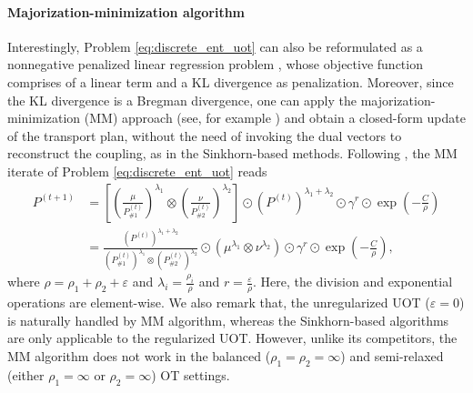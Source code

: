 \paragraph{Majorization-minimization algorithm} Interestingly, Problem \eqref{eq:discrete_ent_uot}
can also be reformulated as a nonnegative penalized linear regression problem \citep{Chapel21},
whose objective function comprises of a linear term and a KL divergence as penalization.
Moreover, since the KL divergence is a Bregman divergence, one can apply the
majorization-minimization (MM) approach (see, for example \citep{Hunter04,Sun17}) and obtain
a closed-form update of the transport plan, without the need of invoking the dual vectors
to reconstruct the coupling, as in the Sinkhorn-based methods. Following \citep{Chapel21},
the MM iterate of Problem \eqref{eq:discrete_ent_uot} reads
\begin{align}
    P^{(t+1)} &= \left[ \left( \frac{\mu}{P^{(t)}_{\# 1}}\right)^{\lambda_1} \otimes
    \left( \frac{\nu}{P^{(t)}_{\# 2}}\right)^{\lambda_2} \right] \odot
    (P^{(t)})^{\lambda_1 + \lambda_2} \odot \gamma^r \odot \exp\left(-\frac{C}{\rho} \right) \\
    &= \frac{(P^{(t)})^{\lambda_1 + \lambda_2}}{(P^{(t)}_{\# 1})^{\lambda_1}
    \otimes (P^{(t)}_{\# 2})^{\lambda_2}}
    \odot \left( \mu^{\lambda_1} \otimes \nu^{\lambda_2} \right) \odot \gamma^r
    \odot \exp\left(-\frac{C}{\rho} \right),
\end{align}
where $\rho = \rho_1 + \rho_2 + \varepsilon$ and
$\lambda_i = \frac{\rho_i}{\rho}$ and $r = \frac{\varepsilon}{\rho}$.
Here, the division and exponential operations are element-wise. We also remark that,
the unregularized UOT ($\varepsilon = 0$) is naturally handled by MM algorithm,
whereas the Sinkhorn-based algorithms are only applicable to the regularized UOT. However,
unlike its competitors, the MM algorithm does not work in the balanced ($\rho_1=\rho_2=\infty$)
and semi-relaxed (either $\rho_1=\infty$ or $\rho_2=\infty$) OT settings.

